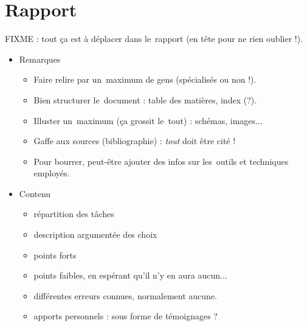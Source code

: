 \section{Rapport}
FIXME : tout ça est à déplacer dans le~rapport (en tête pour ne rien oublier !).
\begin{itemize}
    \item Remarques %
        \begin{itemize}
            \item Faire relire par un~maximum de gens (spécialisés ou non !).
            \item Bien structurer le~document : table des matières, index (?).
            \item Illuster un~maximum (ça grossit le~tout) : schémas, images... 
            \item Gaffe aux sources (bibliographie) : \textit{tout} doit être cité !
            \item Pour bourrer, peut-être ajouter des infos sur les~outils et techniques employés.
        \end{itemize}
    \item Contenu %
        \begin{itemize}
            \item répartition des tâches
            \item description argumentée des choix
            \item points forts
            \item points faibles, en espérant qu'il n'y en aura aucun...
            \item différentes erreurs connues, normalement aucune.
            \item apports personnels : sous forme de témoignages ?
        \end{itemize}
\end{itemize}
